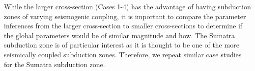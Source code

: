 \documentclass[12pt]{article}
\begin{document}
While the larger cross-section (Cases 1-4) has the advantage of having subduction zones of varying seismogenic coupling, it is important to compare the parameter inferences from the larger cross-section to smaller cross-sections to determine if the global parameters would be of similar magnitude and how. The Sumatra subduction zone is of particular interest as it is thought to be one of the more seismically coupled subduction zones. Therefore, we repeat similar case studies for the Sumatra subduction zone.

\begin{figure}[H]
\centering
\hspace{-0.4cm}
\hspace{-0.1cm}
\hspace{-0.2cm}
\hspace{-0.2cm}
\end{figure}
\end{document}

